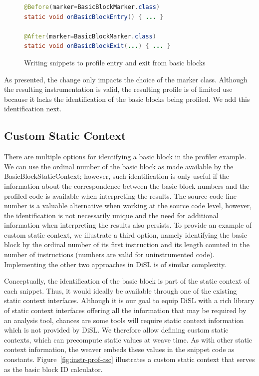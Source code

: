 \documentclass{article}
\newcommand{\brcode}[1]{\textsf{#1}}
\newcommand{\code}[1]{\mbox{\brcode{#1}}}
\begin{document}
\begin{figure}[t!]
\smaller
\begin{lstlisting}[language=Java]
@Before(marker=BasicBlockMarker.class)
static void onBasicBlockEntry() { ... }

@After(marker=BasicBlockMarker.class)
static void onBasicBlockExit(...) { ... }
\end{lstlisting}
\caption{Writing snippets to profile entry and exit from basic blocks}
\label{fig:instr-prof-basic blocks}
\end{figure}

As presented, the change only impacts the choice of the marker class.
Although the resulting instrumentation is valid, the resulting profile is of limited use because it lacks the identification of the basic blocks being profiled.
We add this identification next.


\subsection{Custom Static Context}

There are multiple options for identifying a basic block in the profiler example.
We can use the ordinal number of the basic block as made available by the \code{BasicBlockStaticContext}; however, such identification is only useful if the information about the correspondence between the basic block numbers and the profiled code is available when interpreting the results.
The source code line number is a valuable alternative when working at the source code level, however, the identification is not necessarily unique and the need for additional information when interpreting the results also persists.
To provide an example of custom static context, we illustrate a third option, namely identifying the basic block by the ordinal number of its first instruction and its length counted in the number of instructions (numbers are valid for uninstrumented code).
Implementing the other two approaches in DiSL is of similar complexity.

Conceptually, the identification of the basic block is part of the static context of each snippet.
Thus, it would ideally be available through one of the existing static context interfaces.
Although it is our goal to equip DiSL with a rich library of static context interfaces offering all the information that may be required by an analysis tool, chances are some tools will require static context information which is not provided by DiSL.
We therefore allow defining custom static contexts, which can precompute static values at weave time.
As with other static context information, the weaver embeds these values in the snippet code as constants.
Figure~\ref{fig:instr-prof-csc} illustrates a custom static context that serves as the basic block ID calculator.
\end{document}
